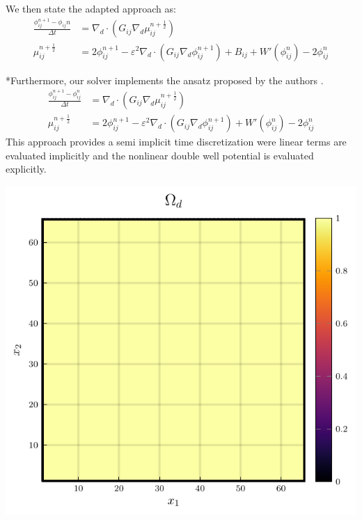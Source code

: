 \documentclass{mimosis}
\begin{document}
We then state the adapted approach as:
\begin{equation}
\label{eq:second-order-adapted-ansatz}
\begin{aligned}
\frac{\phi_{ij}^{n+1} - \phi_{ij}n}{\Delta t}  &=  \nabla _d \cdot (G_{ij} \nabla_d \mu_{ij}^{n+\frac{1}{2}} )  \\
 \mu_{ij}^{n+\frac{1}{2}} &= 2\phi_{ij}^{n+1} - \varepsilon^2  \nabla_d \cdot  (G_{ij} \nabla _d \phi_{ij}^{n+1} ) + B_{ij} + W'(\phi_{ij}^n) - 2\phi _{ij}^n
\end{aligned}
\end{equation}

*Furthermore, our solver implements the ansatz proposed by the authors \autocite{SHIN20117441}.
\begin{equation}
\label{eq:ansatz}
\begin{aligned}
\frac{\phi_{ij}^{n+1} - \phi_{ij}^n}{\Delta t}  &=  \nabla _d \cdot (G_{ij} \nabla_d \mu_{ij}^{n+\frac{1}{2}} )  \\
 \mu_{ij}^{n+\frac{1}{2}} &= 2\phi_{ij}^{n+1} - \varepsilon^2  \nabla_d \cdot  (G_{ij} \nabla _d \phi_{ij}^{n+1} ) + W'(\phi_{ij}^n) - 2\phi _{ij}^n
\end{aligned}
\end{equation}
This approach provides a semi implicit time discretization were linear terms are evaluated implicitly and the nonlinear double well potential is evaluated explicitly.

\begin{center}
\includegraphics[width=.9\linewidth]{images/domain.png}
\label{}
\end{center}
\end{document}
